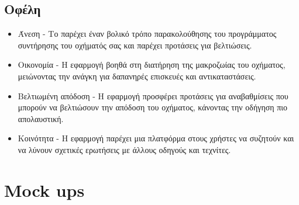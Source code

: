 \documentclass[11pt]{scrartcl} %
\begin{document}
\subsection*{Οφέλη}
    \begin{itemize}
        \item Άνεση - Το  παρέχει έναν βολικό τρόπο παρακολούθησης του προγράμματος συντήρησης του οχήματός σας και παρέχει προτάσεις για βελτιώσεις.
        \item Οικονομία - Η εφαρμογή βοηθά στη διατήρηση της μακροζωίας του οχήματος, μειώνοντας την ανάγκη για δαπανηρές επισκευές και αντικαταστάσεις.
        \item Βελτιωμένη απόδοση - Η εφαρμογή προσφέρει προτάσεις για αναβαθμίσεις που μπορούν να βελτιώσουν την απόδοση του οχήματος, κάνοντας την οδήγηση πιο απολαυστική.
        \item Κοινότητα - Η εφαρμογή παρέχει μια πλατφόρμα στους χρήστες να συζητούν και να λύνουν σχετικές ερωτήσεις με άλλους οδηγούς και τεχνίτες.
    \end{itemize}

\pagebreak

\section*{Mock ups \cite{materialdesign}}
\end{document}
